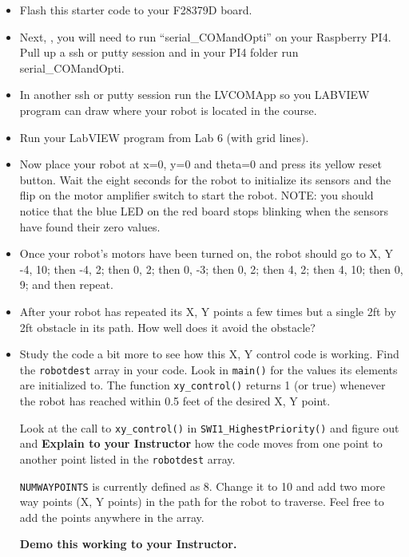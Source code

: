 \documentclass[11pt]{article}
\begin{document}
\begin{itemize}
    \item Flash this starter code to your F28379D board.
    \item Next, , you will need to run “serial\_COMandOpti” on your Raspberry PI4. Pull up a ssh or putty session and in your PI4 folder run serial\_COMandOpti.
    \item In another ssh or putty session run the LVCOMApp so you LABVIEW program can draw where your robot is located in the course.
    \item Run your LabVIEW program from Lab 6 (with grid lines).
    \item Now place your robot at x=0, y=0 and theta=0  and press its yellow reset button. Wait the eight seconds for the robot to initialize its sensors and the flip on the motor amplifier switch to start the robot. NOTE: you should notice that the blue LED on the red board stops blinking when the sensors have found their zero values.
    \item Once your robot’s motors have been turned on, the robot should go to X, Y -4, 10; then -4, 2; then 0, 2; then 0, -3; then 0, 2; then 4, 2; then 4, 10; then 0, 9; and then repeat.
    \item After your robot has repeated its X, Y points a few times but a single 2ft by 2ft obstacle in its path. How well does it avoid the obstacle?
        \item Study the code a bit more to see how this X, Y control code is working. Find the \texttt{robotdest} array in your code. Look in \texttt{main()} for the values its elements are initialized to. The function \texttt{xy_control()} returns 1 (or true) whenever the robot has reached within 0.5 feet of the desired X, Y point.
        \begin{checkoff}
                Look at the call to \texttt{xy_control()} in \texttt{SWI1_HighestPriority()} and figure out and \textbf{Explain to your Instructor} how the code moves from one point to another point listed in the \texttt{robotdest} array.
        \end{checkoff}
        \texttt{NUMWAYPOINTS} is currently defined as 8. Change it to 10 and add two more way points (X, Y points) in the path for the robot to traverse. Feel free to add the points anywhere in the array.
        \begin{checkoff}
                \textbf{Demo this working to your Instructor.}
        \end{checkoff}
\end{itemize}
%
\end{document}
